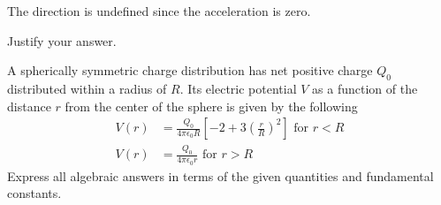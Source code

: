 \documentclass{../../oss-apphys-exam}
\begin{document}
\begin{questions}
\begin{parts}
    \vspace{.1in}\underline{\hspace{.3in}} The direction is undefined since the
    acceleration is zero.

    \vspace{.1in}Justify your answer.
    \vspace{\stretch3}
    
  \end{parts}
  \newpage
  
  \question A spherically symmetric charge distribution has net positive charge
  $Q_0$ distributed within a radius of $R$. Its electric potential $V$ as a
  function of the distance $r$ from the center of the sphere is given by the
  following
  \begin{align*}
    V(r) &= \frac{Q_0}{4\pi\epsilon_0R}\left[-2+3\left(\frac rR\right)^2 \right]
    \text{ for } r<R\\
    V(r) &= \frac{Q_0}{4\pi\epsilon_0r}\text{ for } r>R
  \end{align*}
  Express all algebraic answers in terms of the given quantities and
  fundamental constants.
\end{questions}
\end{document}
